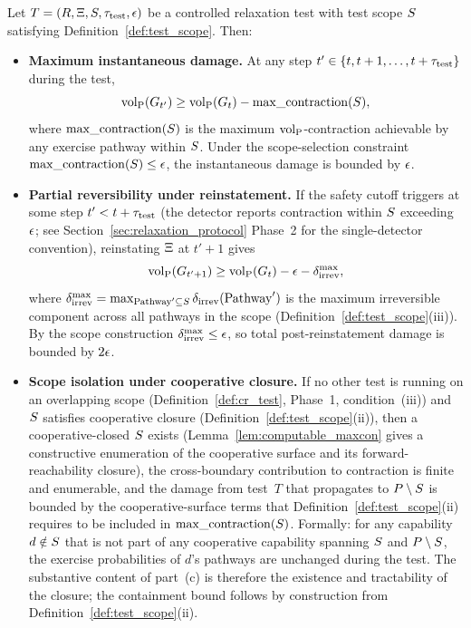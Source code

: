 \begin{theorem}
\label{thm:damage_bound}
Let $T = (R, \Xi, S, \tau_{\mathrm{test}}, \epsilon)$ be a
controlled relaxation test with test scope $S$ satisfying
Definition~\ref{def:test_scope}.  Then:
\begin{itemize}
\item[(a)] \textbf{Maximum instantaneous damage.}  At any step
  $t' \in \{t, t+1, \ldots, t + \tau_{\mathrm{test}}\}$ during the test,
  $$
  {\operatorname{vol}_{\mathrm{P}}}(G_{t'}) \geq {\operatorname{vol}_{\mathrm{P}}}(G_t) - \mathrm{max\_contraction}(S),
  $$
  where $\mathrm{max\_contraction}(S)$ is the maximum ${\operatorname{vol}_{\mathrm{P}}}$-contraction
  achievable by any exercise pathway within $S$.  Under the
  scope-selection constraint
  $\mathrm{max\_contraction}(S) \leq \epsilon$, the instantaneous damage
  is bounded by $\epsilon$.
\item[(b)] \textbf{Partial reversibility under reinstatement.}
  If the safety cutoff triggers at some step
  $t' < t + \tau_{\mathrm{test}}$ (the detector reports contraction within
  $S$ exceeding $\epsilon$; see
  Section~\ref{sec:relaxation_protocol} Phase~2 for the
  single-detector convention), reinstating $\Xi$ at
  $t' + 1$ gives
  $$
  {\operatorname{vol}_{\mathrm{P}}}(G_{t'+1}) \geq {\operatorname{vol}_{\mathrm{P}}}(G_t) - \epsilon
       - \delta_{\mathrm{irrev}}^{\max},
  $$
  where
  $\delta_{\mathrm{irrev}}^{\max} = \max_{\mathrm{Pathway}' \subseteq S}
      \delta_{\mathrm{irrev}}(\mathrm{Pathway}')$
  is the maximum irreversible component across all pathways in
  the scope (Definition~\ref{def:test_scope}(iii)).  By the scope
  construction $\delta_{\mathrm{irrev}}^{\max} \leq \epsilon$, so total
  post-reinstatement damage is bounded by $2\epsilon$.
\item[(c)] \textbf{Scope isolation under cooperative closure.}
  If no other test is running on an overlapping scope
  (Definition~\ref{def:cr_test}, Phase~1, condition~(iii))
  and $S$ satisfies cooperative closure
  (Definition~\ref{def:test_scope}(ii)), then a cooperative-closed
  $S$ exists (Lemma~\ref{lem:computable_maxcon} gives a
  constructive enumeration of the cooperative surface and its
  forward-reachability closure), the cross-boundary contribution
  to contraction is finite and enumerable, and the damage from
  test~$T$ that propagates to $P \setminus S$ is bounded by
  the cooperative-surface terms that Definition~\ref{def:test_scope}(ii)
  requires to be included in $\mathrm{max\_contraction}(S)$.  Formally: for
  any capability $d \notin S$ that is not part of any
  cooperative capability spanning $S$ and $P \setminus S$,
  the exercise probabilities of $d$'s pathways are unchanged
  during the test.  The substantive content of part~(c) is
  therefore the existence and tractability of the closure; the
  containment bound follows by construction from
  Definition~\ref{def:test_scope}(ii).
\end{itemize}
\end{theorem}


